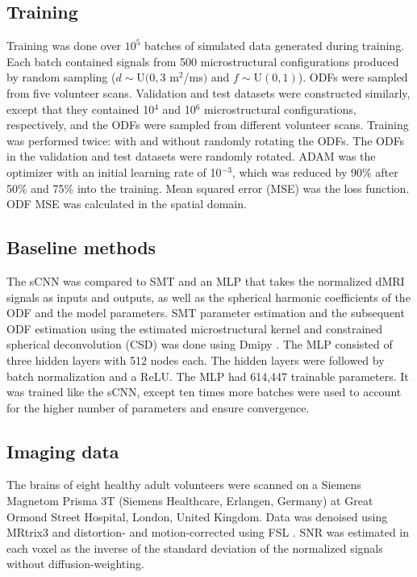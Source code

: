 \documentclass[10pt, letterpaper, oneside]{article}
\begin{document}
\subsection{Training}

Training was done over $10^5$ batches of simulated data generated during training. Each batch contained signals from 500 microstructural configurations produced by random sampling ($d \sim \text{U}(0, 3$ \textmu m$^2$/ms$)$ and $f \sim \text{U}(0, 1)$). ODFs were sampled from five volunteer scans. Validation and test datasets were constructed similarly, except that they contained 10$^4$ and 10$^6$ microstructural configurations, respectively, and the ODFs were sampled from different volunteer scans. Training was performed twice: with and without randomly rotating the ODFs. The ODFs in the validation and test datasets were randomly rotated. ADAM \citep{kingma2014adam} was the optimizer with an initial learning rate of 10$^{-3}$, which was reduced by 90\% after 50\% and 75\% into the training. Mean squared error (MSE) was the loss function. ODF MSE was calculated in the spatial domain.

\subsection{Baseline methods}

The sCNN was compared to SMT and an MLP that takes the normalized dMRI signals as inputs and outputs, as well as the spherical harmonic coefficients of the ODF and the model parameters. SMT parameter estimation and the subsequent ODF estimation using the estimated microstructural kernel and constrained spherical deconvolution (CSD) was done using Dmipy \citep{fick2019dmipy}. The MLP consisted of three hidden layers with 512 nodes each. The hidden layers were followed by batch normalization and a ReLU. The MLP had 614,447 trainable parameters. It was trained like the sCNN, except ten times more batches were used to account for the higher number of parameters and ensure convergence.

\subsection{Imaging data}

The brains of eight healthy adult volunteers were scanned on a Siemens Magnetom Prisma 3T (Siemens Healthcare, Erlangen, Germany) at Great Ormond Street Hospital, London, United Kingdom. Data was denoised \citep{veraart2016denoising} using MRtrix3 \citep{tournier2019mrtrix3} and distortion- and motion-corrected using FSL \citep{andersson2016integrated, jenkinson2012fsl}. SNR was estimated in each voxel as the inverse of the standard deviation of the normalized signals without diffusion-weighting.
\end{document}
